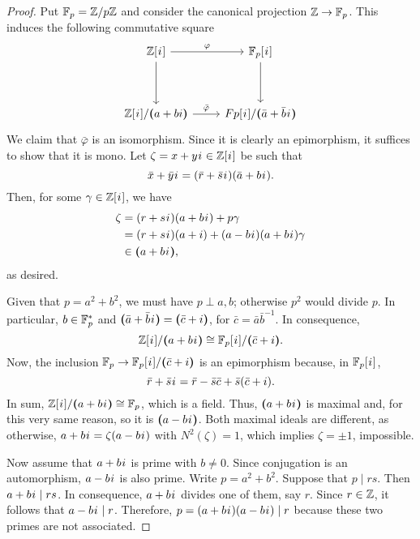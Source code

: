 \begin{proof}
    Put $\F_p =\Z/p\Z$ and consider the canonical projection $\Z\to \F_p$. This induces the following commutative square
    $$
        \begin{tikzcd}[row sep=huge]
            {\Z[\iu]}
                    \arrow[r,"\varphi"]
                    \arrow[d]
                &{\F_p[\iu]}\arrow[d]\\
            {\Z[\iu]/\gen{a+bi}}
                    \arrow[r,"\bar\varphi"]
                &{Fp[\iu]/\gen{\bar a+\bar b\iu}}
        \end{tikzcd}
    $$
    We claim that $\bar\varphi$ is an isomorphism. Since it is clearly an epimorphism, it suffices to show that it is mono. Let $\zeta=x+y\iu\in\Z[\iu]$ be such that
    $$
        \bar x+\bar y\iu=(\bar r+\bar s\iu)(\bar a+b\iu).
    $$
    Then, for some $\gamma\in\Z[\iu]$, we have
    \begin{align*}
        \zeta &= (r+s\iu)(a+b\iu)+p\gamma\\
            &= (r+s\iu)(a+i)+(a-b\iu)(a+b\iu)\gamma\\
            &\in\gen{a+b\iu},
    \end{align*}
    as desired.

    Given that $p=a^2+b^2$, we must have $p\perp a,b$; otherwise $p^2$ would divide $p$. In particular, $b\in \F_p^*$ and $\gen{\bar a + \bar b\iu}=\gen{\bar c+i}$, for $\bar c=\bar a\bar b^{-1}$. In consequence,
    $$
        \Z[\iu]/\gen{a+b\iu}\cong \F_p[\iu]/\gen{\bar c+i}.
    $$
    Now, the inclusion $\F_p\to \F_p[\iu]/\gen{\bar c+i}$ is an epimorphism because, in $\F_p[\iu]$,
    $$
        \bar r+\bar s\iu = \bar r-\bar s\bar c + \bar s(\bar c+i).
    $$
    In sum, $\Z[\iu]/\gen{a+b\iu}\cong \F_p$, which is a field. Thus, $\gen{a+b\iu}$ is maximal and, for this very same reason, so it is $\gen{a-b\iu}$. Both maximal ideals are different, as otherwise, $a+b\iu=\zeta(a-b\iu)$ with $N^2(\zeta)=1$, which implies $\zeta=\pm1$, impossible.

    Now assume that $a+b\iu$ is prime with $b\ne0$. Since conjugation is an automorphism, $a-b\iu$ is also prime. Write $p=a^2+b^2$. Suppose that $p\mid rs$. Then $a+b\iu\mid rs$. In consequence, $a+b\iu$ divides one of them, say $r$. Since $r\in\Z$, it follows that $a-b\iu\mid r$. Therefore, $p=(a+b\iu)(a-b\iu)\mid r$ because these two primes are not associated.
\end{proof}


